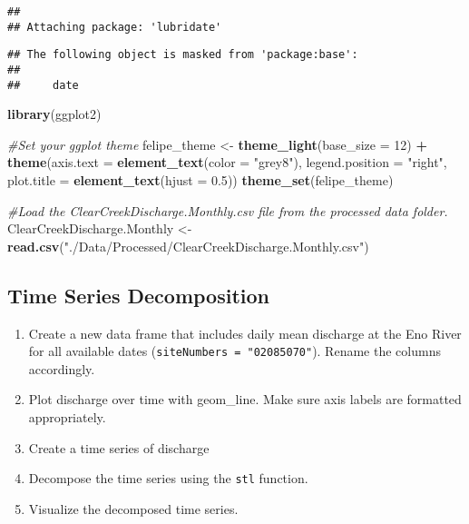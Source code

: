 \documentclass[]{article}
\newenvironment{Shaded}{\begin{snugshade}}{\end{snugshade}}
\newcommand{\CommentTok}[1]{\textcolor[rgb]{0.56,0.35,0.01}{\textit{#1}}}
\newcommand{\DataTypeTok}[1]{\textcolor[rgb]{0.13,0.29,0.53}{#1}}
\newcommand{\DecValTok}[1]{\textcolor[rgb]{0.00,0.00,0.81}{#1}}
\newcommand{\FloatTok}[1]{\textcolor[rgb]{0.00,0.00,0.81}{#1}}
\newcommand{\KeywordTok}[1]{\textcolor[rgb]{0.13,0.29,0.53}{\textbf{#1}}}
\newcommand{\NormalTok}[1]{#1}
\newcommand{\OperatorTok}[1]{\textcolor[rgb]{0.81,0.36,0.00}{\textbf{#1}}}
\newcommand{\StringTok}[1]{\textcolor[rgb]{0.31,0.60,0.02}{#1}}
\providecommand{\tightlist}{%
  \setlength{\itemsep}{0pt}\setlength{\parskip}{0pt}}
\begin{document}
\begin{verbatim}
## 
## Attaching package: 'lubridate'
\end{verbatim}

\begin{verbatim}
## The following object is masked from 'package:base':
## 
##     date
\end{verbatim}

\begin{Shaded}
\begin{Highlighting}[]
\KeywordTok{library}\NormalTok{(ggplot2)}

\CommentTok{#Set your ggplot theme}
\NormalTok{felipe_theme <-}\StringTok{ }\KeywordTok{theme_light}\NormalTok{(}\DataTypeTok{base_size =} \DecValTok{12}\NormalTok{) }\OperatorTok{+}
\StringTok{  }\KeywordTok{theme}\NormalTok{(}\DataTypeTok{axis.text =} \KeywordTok{element_text}\NormalTok{(}\DataTypeTok{color =} \StringTok{"grey8"}\NormalTok{), }
        \DataTypeTok{legend.position =} \StringTok{"right"}\NormalTok{, }\DataTypeTok{plot.title =} \KeywordTok{element_text}\NormalTok{(}\DataTypeTok{hjust =} \FloatTok{0.5}\NormalTok{)) }
\KeywordTok{theme_set}\NormalTok{(felipe_theme)}


\CommentTok{#Load the ClearCreekDischarge.Monthly.csv file from the processed data folder.}
\NormalTok{ClearCreekDischarge.Monthly <-}\StringTok{ }\KeywordTok{read.csv}\NormalTok{(}\StringTok{"./Data/Processed/ClearCreekDischarge.Monthly.csv"}\NormalTok{)}
\end{Highlighting}
\end{Shaded}

\hypertarget{time-series-decomposition}{%
\subsection{Time Series Decomposition}\label{time-series-decomposition}}

\begin{enumerate}
\def\labelenumi{\arabic{enumi}.}
\setcounter{enumi}{4}
\tightlist
\item
  Create a new data frame that includes daily mean discharge at the Eno
  River for all available dates (\texttt{siteNumbers\ =\ "02085070"}).
  Rename the columns accordingly.
\item
  Plot discharge over time with geom\_line. Make sure axis labels are
  formatted appropriately.
\item
  Create a time series of discharge
\item
  Decompose the time series using the \texttt{stl} function.
\item
  Visualize the decomposed time series.
\end{enumerate}
\end{document}
